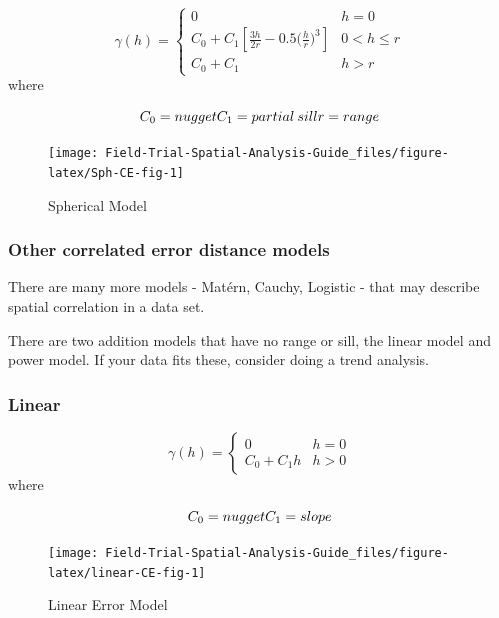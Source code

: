 \documentclass[
]{book}
\begin{document}
\[ \gamma (h) = \left\{ {\begin{array}{cc} 0 & h = 0\\ C_0+C_1 \left[ \frac{3h}{2r}-0.5\bigg( \frac{h}{r}\bigg)^3 \right] & 0 <h \leq r \\ 
C_0 + C_1 & h > r \end{array} } \right. \]
where

\[ C_0 = nugget \\ C_1 = partial \: sill \\ r = range\]

\begin{figure}

{\centering \texttt{[image: Field-Trial-Spatial-Analysis-Guide\_files/figure-latex/Sph-CE-fig-1]} 

}

\caption{Spherical Model}\label{fig:Sph-CE-fig}
\end{figure}

\hypertarget{other-correlated-error-distance-models}{%
\subsubsection{Other correlated error distance models}\label{other-correlated-error-distance-models}}

There are many more models - Matérn, Cauchy, Logistic - that may describe spatial correlation in a data set.

There are two addition models that have no range or sill, the linear model and power model. If your data fits these, consider doing a trend analysis.

\hypertarget{linear}{%
\subsubsection{Linear}\label{linear}}

\[ \gamma (h)=\left\{ {\begin{array}{cc} 0 & h = 0\\ C_0+C_1h & h > 0 \end{array} } \right. \]
where

\[ C_0 = nugget \\ C_1 = slope \]

\begin{figure}

{\centering \texttt{[image: Field-Trial-Spatial-Analysis-Guide\_files/figure-latex/linear-CE-fig-1]} 

}

\caption{Linear Error Model}\label{fig:linear-CE-fig}
\end{figure}
\end{document}
